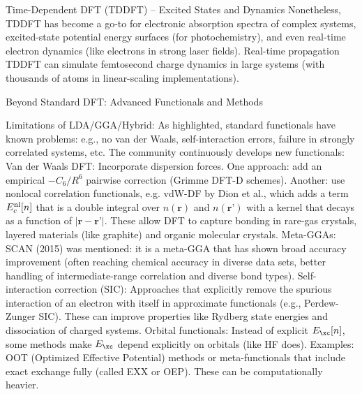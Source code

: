 \begin{frame}{Time-Dependent DFT (TDDFT) – Excited States and Dynamics}
Nonetheless, TDDFT has become a go-to for electronic absorption spectra of complex systems, excited-state potential energy surfaces (for photochemistry), and even real-time electron dynamics (like electrons in strong laser fields). Real-time propagation TDDFT can simulate femtosecond charge dynamics in large systems (with thousands of atoms in linear-scaling implementations). \end{frame}


\begin{frame}{Beyond Standard DFT: Advanced Functionals and Methods}

Limitations of LDA/GGA/Hybrid: As highlighted, standard functionals have known problems: e.g., no van der Waals, self-interaction errors, failure in strongly correlated systems, etc. The community continuously develops new functionals: 
Van der Waals DFT: Incorporate dispersion forces. One approach: add an empirical $-C_6/R^6$ pairwise correction (Grimme DFT-D schemes). Another: use nonlocal correlation functionals, e.g. vdW-DF by Dion et al., which adds a term $E_c^{\rm nl}[n]$ that is a double integral over $n(\mathbf{r})$ and $n(\mathbf{r’})$ with a kernel that decays as a function of $|\mathbf{r}-\mathbf{r’}|$. These allow DFT to capture bonding in rare-gas crystals, layered materials (like graphite) and organic molecular crystals.
Meta-GGAs: SCAN (2015) was mentioned: it is a meta-GGA that has shown broad accuracy improvement (often reaching chemical accuracy in diverse data sets, better handling of intermediate-range correlation and diverse bond types).
Self-interaction correction (SIC): Approaches that explicitly remove the spurious interaction of an electron with itself in approximate functionals (e.g., Perdew-Zunger SIC). These can improve properties like Rydberg state energies and dissociation of charged systems.
Orbital functionals: Instead of explicit $E_{\xc}[n]$, some methods make $E_{\xc}$ depend explicitly on orbitals (like HF does). Examples: OOT (Optimized Effective Potential) methods or meta-functionals that include exact exchange fully (called EXX or OEP). These can be computationally heavier.


\end{frame}
